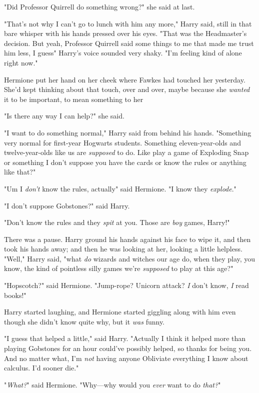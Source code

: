 "Did Professor Quirrell do something wrong?" she said at last.

"That's not why I can't go to lunch with him any more," Harry said, still in
that bare whisper with his hands pressed over his eyes. "That was the
Headmaster's decision. But yeah, Professor Quirrell said some things to me that
made me trust him less, I guess{\el}" Harry's voice sounded very shaky. "I'm
feeling kind of alone right now."

Hermione put her hand on her cheek where Fawkes had touched her yesterday.
She'd kept thinking about that touch, over and over, maybe because she
\emph{wanted} it to be important, to mean something to her{\el}

"Is there any way I can help?" she said.

"I want to do something normal," Harry said from behind his hands. "Something
very normal for first-year Hogwarts students. Something eleven-year-olds and
twelve-year-olds like us are \emph{supposed} to do. Like play a game of
Exploding Snap or something{\el} I don't suppose you have the cards or know
the rules or anything like that?"

"Um{\el} I \emph{don't} know the rules, actually{\el}" said Hermione. "I
know they \emph{explode}."

"I don't suppose Gobstones?" said Harry.

"Don't know the rules and they \emph{spit} at you. Those are \emph{boy} games,
Harry!"

There was a pause. Harry ground his hands against his face to wipe it, and then
took his hands away; and then he was looking at her, looking a little helpless.
"Well," Harry said, "what \emph{do} wizards and witches our age do, when they
play, you know, the kind of pointless silly games we're \emph{supposed} to play
at this age?"

"Hopscotch?" said Hermione. "Jump-rope? Unicorn attack? \emph{I} don't know,
\emph{I} read books!"

Harry started laughing, and Hermione started giggling along with him even
though she didn't know quite why, but it \emph{was} funny.

"I guess that helped a little," said Harry. "Actually I think it helped more
than playing Gobstones for an hour could've possibly helped, so thanks for
being you. And no matter what, I'm \emph{not} having anyone Obliviate
everything I know about calculus. I'd sooner die."

"\emph{What?}" said Hermione. "Why---why would you \emph{ever} want to do
\emph{that?}"

